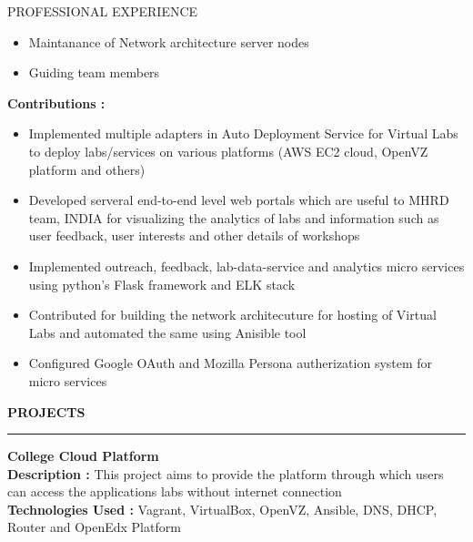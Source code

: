\documentclass{resume} %
\begin{document}
\begin{rSection}{PROFESSIONAL EXPERIENCE}
\begin{rSubsection}
\begin{itemize}
    \item Maintanance of Network architecture server nodes

    \item Guiding team members
    \end{itemize}

    \hfill

    \textbf{Contributions : }
    \begin{itemize}

    \item Implemented multiple adapters in Auto Deployment
      Service for Virtual Labs to deploy labs/services on
      various platforms (AWS EC2 cloud, OpenVZ platform and
      others)
      
    \item Developed serveral end-to-end level web portals
      which are useful to MHRD team, INDIA for visualizing
      the analytics of labs and information such as user
      feedback, user interests and other details of
      workshops
      
    \item Implemented outreach, feedback, lab-data-service
      and analytics micro services using python's Flask
      framework and ELK stack
      
    \item Contributed for building the network architecuture
      for hosting of Virtual Labs and automated the same
      using Anisible tool

    \item Configured Google OAuth and Mozilla Persona
      autherization system for micro services
      
    \end{itemize}
  \end{rSubsection}

\end{rSection}





\textbf{PROJECTS}
\sectionlineskip
\hrule
\textbf{College Cloud Platform} \\
\textbf{Description :} This project aims to provide the platform through which users can access the
applications labs without internet connection \\
\textbf{Technologies Used :} Vagrant, VirtualBox, OpenVZ, Ansible, DNS, DHCP,
Router and OpenEdx Platform
\end{document}
